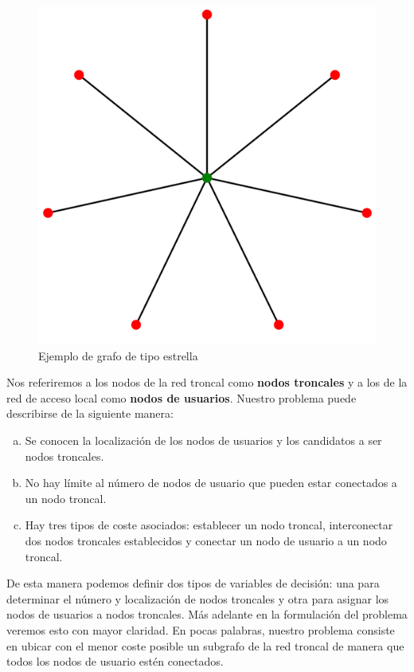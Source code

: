\documentclass[twoside,12pt]{article}
\begin{document}
\begin{figure}[h!]
\centering
\includegraphics[scale=0.1]{star}
\caption{Ejemplo de grafo de tipo estrella}
\end{figure}
Nos referiremos a los nodos de la red troncal como \textbf{nodos troncales} y a los de la red de acceso local como \textbf{nodos de usuarios}. Nuestro problema puede describirse de la siguiente manera:
\begin{enumerate}[(a)]
\item Se conocen la localización de los nodos de usuarios y los candidatos a ser nodos troncales. 
\item No hay límite al número de nodos de usuario que pueden estar conectados a un nodo troncal.
\item Hay tres tipos de coste asociados: establecer un nodo troncal, interconectar dos nodos troncales establecidos y conectar un nodo de usuario a un nodo troncal.
\end{enumerate}
De esta manera podemos definir dos tipos de variables de decisión: una para determinar el número y localización de nodos troncales y otra para asignar los nodos de usuarios a nodos troncales. Más adelante en la formulación del problema veremos esto con mayor claridad. En pocas palabras, nuestro problema consiste en ubicar con el menor coste posible un subgrafo de la red troncal de manera que todos los nodos de usuario estén conectados.
\end{document}
